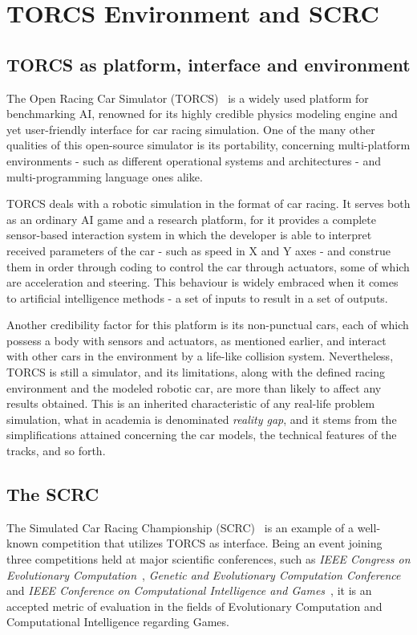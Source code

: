 \section{\textbf{TORCS Environment and SCRC}} \label{sec:torcs}

\subsection{TORCS as platform, interface and environment}

	The Open Racing Car Simulator (TORCS)~\cite{TORCS} is a widely used platform for benchmarking AI, renowned for
	its	highly credible physics modeling engine and yet user-friendly interface for car racing simulation. One of
	the	many other qualities of this open-source simulator is its portability, concerning multi-platform environments
	- such as different operational systems and architectures - and multi-programming language ones alike.
	
	TORCS deals with a robotic simulation in the format of car racing. It serves both as an ordinary AI game and a
	research platform, for it provides a complete sensor-based interaction system in which the developer is able to
	interpret received parameters of the car - such as speed in X and Y axes - and construe them in order through
	coding to control the car through actuators, some of which are acceleration and steering. This behaviour is
	widely embraced when it comes to artificial intelligence methods - a set of inputs to result in a set of outputs.
	
	Another credibility factor for this platform is its non-punctual cars, each of which possess a body with sensors
	and actuators, as mentioned earlier, and interact with other cars in the environment by a life-like collision
	system. Nevertheless, TORCS is still a simulator, and its limitations, along with the defined racing environment
	and the modeled robotic car, are more than likely to affect any results obtained. This is an inherited
	characteristic of any real-life problem simulation, what in academia is denominated \emph{reality gap}, and it
	stems from the simplifications attained concerning the car models, the technical features of the tracks, and so
	forth.

\subsection{The SCRC}

	The Simulated Car Racing Championship (SCRC)~\cite{SCRC} is an example of a well-known competition that utilizes
	TORCS as interface. Being an event joining three competitions held at major scientific conferences, such as
	\emph{IEEE Congress on Evolutionary Computation}~\cite{CEC}, \emph{Genetic and Evolutionary Computation
	Conference}~\cite{GECCO} and \emph{IEEE Conference on Computational Intelligence and Games}~\cite{CIG}, it is
	an accepted	metric of evaluation in the fields of Evolutionary Computation and Computational Intelligence
	regarding Games.
	
